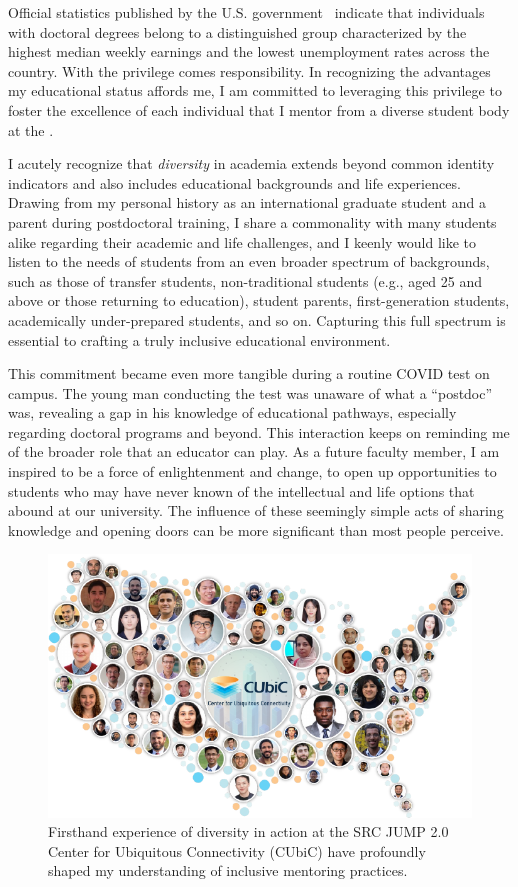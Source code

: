 Official statistics published by the U.S. government~\cite{EducationPaysBureau} indicate that individuals with doctoral degrees belong to a distinguished group characterized by the highest median weekly earnings and the lowest unemployment rates across the country. With the privilege comes responsibility. In recognizing the advantages my educational status affords me, I am committed to leveraging this privilege to foster the excellence of each individual that I mentor from a diverse student body at the \appSchool{}.

I acutely recognize that \emph{diversity} in academia extends beyond common identity indicators and also includes educational backgrounds and life experiences. Drawing from my personal history as an international graduate student and a parent during postdoctoral training, I share a commonality with many students alike regarding their academic and life challenges, and I keenly would like to listen to the needs of students from an even broader spectrum of backgrounds, such as those of transfer students, non-traditional students (e.g., aged 25 and above or those returning to education), student parents, first-generation students, academically under-prepared students, and so on. Capturing this full spectrum is essential to crafting a truly inclusive educational environment.


This commitment became even more tangible during a routine COVID test on campus. The young man conducting the test was unaware of what a ``postdoc'' was, revealing a gap in his knowledge of educational pathways, especially regarding doctoral programs and beyond. This interaction keeps on reminding me of the broader role that an educator can play. As a future faculty member, I am inspired to be a force of enlightenment and change, to open up opportunities to students who may have never known of the intellectual and life options that abound at our university. The influence of these seemingly simple acts of sharing knowledge and opening doors can be more significant than most people perceive.

\begin{figure}[!ht]
    \centering
    \includegraphics[width=0.4\linewidth]{../../fig/diversity.pdf}
    \caption{Firsthand experience of diversity in action at the SRC JUMP 2.0 Center for Ubiquitous Connectivity (CUbiC) have profoundly shaped my understanding of inclusive mentoring practices.}
    \label{fig:diversity}
\end{figure}


